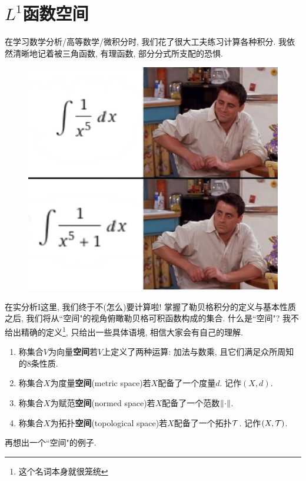 \section{$L^1$函数空间}\label{L1_space}
在学习数学分析/高等数学/微积分时, 我们花了很大工夫练习计算各种积分. 我依然清晰地记着被三角函数, 有理函数, 部分分式所支配的恐惧. 
\begin{figure}[h]
    \centering
    \includegraphics[scale=0.4]{image/integrate_meme.png}
\end{figure}
在实分析I这里, 我们终于不(怎么)要计算啦! 掌握了勒贝格积分的定义与基本性质之后, 我们将从``空间"的视角俯瞰勒贝格可积函数构成的集合. 
什么是``空间"? 我不给出精确的定义\footnote{这个名词本身就很笼统}, 
只给出一些具体语境, 相信大家会有自己的理解.
\begin{enumerate}
    \item 称集合$V$为向量\textbf{空间}若$V$上定义了两种运算: 加法与数乘, 且它们满足众所周知的8条性质. 
    \item 称集合$X$为度量\textbf{空间}(metric space)若$X$配备了一个度量$d$. 记作$(X, d)$.
    \item 称集合$X$为赋范\textbf{空间}(normed space)若$X$配备了一个范数$\norm{\cdot}$.
    \item 称集合$X$为拓扑\textbf{空间}(topological space)若$X$配备了一个拓扑$\mathcal{T}$. 记作$(X, \mathcal{T})$.
\end{enumerate}
\begin{exercise}
    再想出一个``空间"的例子.
\end{exercise}

